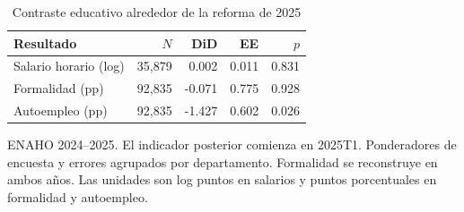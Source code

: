 \begin{table}[!htbp]\centering
\caption{Contraste educativo alrededor de la reforma de 2025}\label{tab:short_2025}
\begin{threeparttable}\small
\setlength{\tabcolsep}{4pt}
\begin{tabular}{lrrrr}
\toprule
Resultado & $N$ & DiD & EE & $p$ \\
\midrule
Salario horario (log) & 35,879 & 0.002 & 0.011 & 0.831 \\
Formalidad (pp) & 92,835 & -0.071 & 0.775 & 0.928 \\
Autoempleo (pp) & 92,835 & -1.427 & 0.602 & 0.026 \\
\bottomrule
\end{tabular}
\begin{tablenotes}\footnotesize
\item ENAHO 2024--2025. El indicador posterior comienza en 2025T1. Ponderadores de encuesta y errores agrupados por departamento. Formalidad se reconstruye en ambos años. Las unidades son log puntos en salarios y puntos porcentuales en formalidad y autoempleo.
\end{tablenotes}
\end{threeparttable}\end{table}
